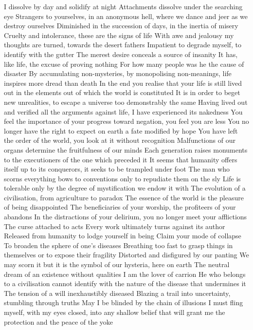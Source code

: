 \documentclass{article}
\begin{document}
I dissolve by day and solidify at night
Attachments dissolve under the searching eye
Strangers to yourselves, in an anonymous hell, where we dance and jeer as we destroy ourselves
Diminished in the succession of days, in the inertia of misery
Cruelty and intolerance, these are the signs of life
With awe and jealousy my thoughts are turned, towards the desert fathers
Impatient to degrade myself, to identify with the gutter
The merest desire conceals a source of insanity
It has, like life, the excuse of proving nothing
For how many people was he the cause of disaster
By accumulating non-mysteries, by monopolising non-meanings, life inspires more dread than death
In the end you realise that your life is still lived out in the elements out of which the world is constituted
It is in order to beget new unrealities, to escape a universe too demonstrably the same
Having lived out and verified all the arguments against life, I have experienced its nakedness
You feel the importance of your progress toward negation, you feel you are less
You no longer have the right to expect on earth a fate modified by hope
You have left the order of the world, you look at it without recognition
Malfunctions of our organs determine the fruitfulness of our minds
Each generation raises monuments to the executioners of the one which preceded it
It seems that humanity offers itself up to its conquerors, it seeks to be trampled under foot
The man who scorns everything bows to conventions only to repudiate them on the sly
Life is tolerable only by the degree of mystification we endow it with
The evolution of a civilisation, from agriculture to paradox
The essence of the world is the pleasure of being disappointed
The beneficiaries of your worship, the profiteers of your abandons
In the distractions of your delirium, you no longer meet your afflictions
The curse attached to acts
Every work ultimately turns against its author
Released from humanity to lodge yourself in being
Claim your mode of collapse
To broaden the sphere of one's diseases
Breathing too fast to grasp things in themselves or to expose their fragility
Distorted and disfigured by our panting
We may scorn it but it is the symbol of our hysteria, here on earth
The neutral dream of an existence without qualities
I am the lover of carrion
He who belongs to a civilisation cannot identify with the nature of the disease that undermines it
The tension of a will inexhaustibly diseased
Blazing a trail into uncertainty, stumbling through truths
May I be blinded by the chain of illusions
I must fling myself, with my eyes closed, into any shallow belief that will grant me the protection and the peace of the yoke
\end{document}
